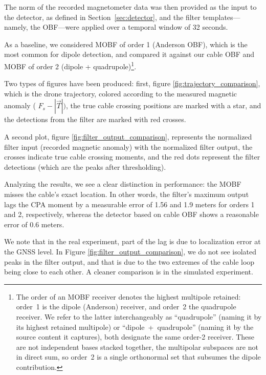 The norm of the recorded magnetometer data was then provided as the input to the detector, as defined in Section~\ref{sec:detector}, and the filter templates—namely, the OBF—were applied over a temporal window of 32 seconds.


As a baseline, we considered MOBF of order 1 (Anderson OBF), which is the most common for dipole detection, and compared it against our cable OBF and MOBF of order 2 (dipole + quadrupole)\footnote{The order of an MOBF receiver denotes the highest multipole
retained: order~1 is the dipole (Anderson) receiver, and order~2 the
quadrupole receiver. We refer to the latter interchangeably as
``quadrupole'' (naming it by its highest retained multipole) or
``dipole~+~quadrupole'' (naming it by the source content it captures),
both designate the same order-2 receiver. These are not independent bases
stacked together, the multipolar subspaces are not in direct sum, so
order~2 is a single orthonormal set that subsumes the dipole contribution.}.

Two types of figures have been produced: first, figure \ref{fig:trajectory_comparison}, which is the drone trajectory, colored according to the measured magnetic anomaly ( $F_s - |\vec T |) $, the true cable crossing positions are marked with a star, and the detections from the filter are marked with red crosses.

A second plot, figure \ref{fig:filter_output_comparison}, represents the normalized filter input (recorded magnetic anomaly) with the normalized filter output, the crosses indicate true cable crossing moments, and the red dots represent the filter detections (which are the peaks after thresholding).


Analyzing the results, we see a clear distinction in performance: the MOBF misses the cable's exact location. In other words, the filter's maximum output lags the CPA moment by a measurable error of 1.56 and 1.9 meters for orders 1 and 2, respectively, whereas the detector based on cable OBF shows a reasonable error of 0.6 meters. 

We note that in the real experiment, part of the lag is due to localization error at the GNSS level. In Figure \ref{fig:filter_output_comparison}, we do not see isolated peaks in the filter output, and that is due to the two extremes of the cable loop being close to each other. A cleaner comparison is in the simulated experiment.


